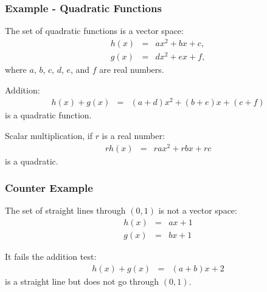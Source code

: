\documentclass{beamer}
\begin{document}
\begin{frame}
  \frametitle{Example - Quadratic Functions}

  The set of quadratic functions is a vector space:
  \begin{eqnarray*}
    h(x) & = & a x^2 + bx + c, \\
    g(x) & = & dx^2 + ex + f,
  \end{eqnarray*}
  where $a$, $b$, $c$, $d$, $e$, and $f$ are real numbers.

  Addition:
  \begin{eqnarray*}
    h(x)+g(x) & = & (a+d) x^2 + (b+e) x + (c+f)
  \end{eqnarray*}
  is a quadratic function.

  Scalar multiplication, if $r$ is a real number:
  \begin{eqnarray*}
    r h(x) & = & ra x^2 + rb x + rc
  \end{eqnarray*}
  is a quadratic.

\end{frame}


\begin{frame}
  \frametitle{Counter Example}

  The set of straight lines through $(0,1)$ is not a vector space:
  \begin{eqnarray*}
    h(x) & = & ax + 1 \\
    g(x) & = & bx + 1
  \end{eqnarray*}

  It fails the addition test:
  \begin{eqnarray*}
    h(x) + g(x) & = & (a+b)x + 2
  \end{eqnarray*}
  is a straight line but does not go through $(0,1)$.

\end{frame}
\end{document}

